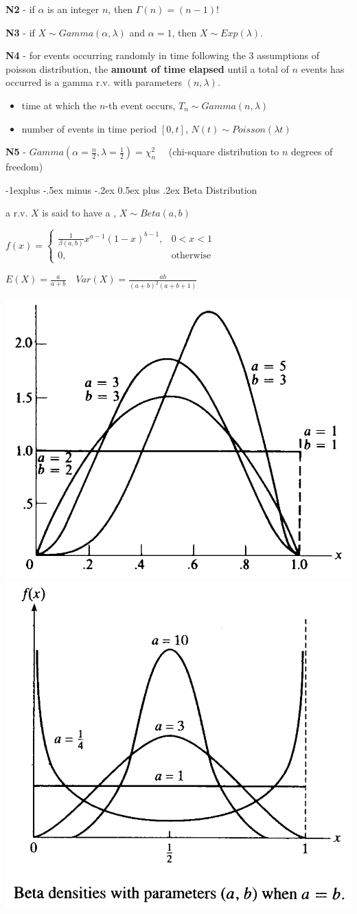 \documentclass[10pt, landscape]{article}
\makeatletter
\renewcommand{\subsection}{\@startsection{subsection}{2}{0mm}%
  {-1explus -.5ex minus -.2ex}%
  {0.5ex plus .2ex}%
{\normalfont\normalsize\bfseries}}
\makeatother
\begin{document}
\begin{multicols*}{3}
\begin{minipage}[c]{0.55\linewidth}
    \textbf{N2} - if $\alpha$ is an integer $n$, then $\Gamma(n) = (n-1)!$

    \textbf{N3} - if $X \sim Gamma(\alpha, \lambda)$ and $\alpha = 1$, then $X \sim Exp(\lambda)$.
  \end{minipage}

  \textbf{N4} - for events occurring randomly in time following the 3 assumptions of poisson distribution, 
  the \textbf{amount of time elapsed} until a total of $n$ events has occurred is a gamma r.v. with parameters $(n, \lambda)$.
  \begin{itemize}
    \item time at which the $n$-th event occurs, $T_n \sim Gamma(n, \lambda)$ 
    \item number of events in time period $[0, t]$, $N(t) \sim Poisson(\lambda t)$
  \end{itemize}

  \textbf{N5} - $Gamma(\alpha = \frac{n}{2}, \lambda = \frac{1}{2}) = \chi^2_n \quad$ (chi-square distribution to $n$ degrees of freedom)


  \subsection{Beta Distribution}

  a r.v. $X$ is said to have a , $X \sim Beta(a, b)$ 

  \begin{tightcenter}
    $f(x) = \begin{cases} \frac{1}{\beta(a, b)} x^{a-1} (1-x)^{b-1}, &0 < x < 1 \\ 0, &\text{otherwise} \end{cases} $

    $E(X) = \frac{a}{a+b} \quad Var(X) = \frac{ab}{(a+b)^2 (a+b+1)} $
  \end{tightcenter}

  \begin{tightcenter}
    \includegraphics[width=0.35\linewidth]{st2131-beta-distribution-2.png} 
    \includegraphics[width=0.35\linewidth]{st2131-beta-distribution-1.png} 
  \end{tightcenter}


\end{multicols*}
\end{document}
